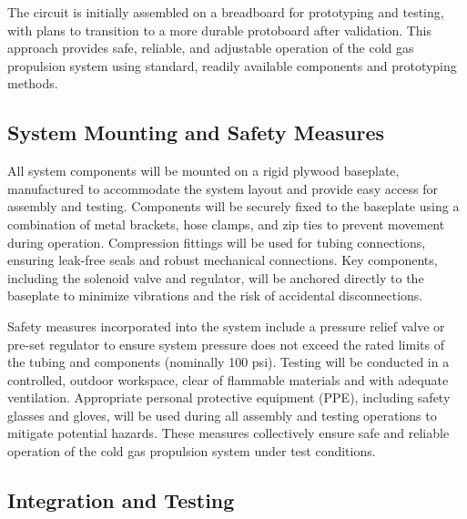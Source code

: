 \documentclass{new-aiaa}
\begin{document}
The circuit is initially assembled on a breadboard for prototyping and testing, with plans to transition to a more durable protoboard after validation. This approach provides safe, reliable, and adjustable operation of the cold gas propulsion system using standard, readily available components and prototyping methods.


\subsection{System Mounting and Safety Measures}

All system components will be mounted on a rigid plywood baseplate, manufactured to accommodate the system layout and provide easy access for assembly and testing. Components will be securely fixed to the baseplate using a combination of metal brackets, hose clamps, and zip ties to prevent movement during operation. Compression fittings will be used for tubing connections, ensuring leak-free seals and robust mechanical connections. Key components, including the solenoid valve and regulator, will be anchored directly to the baseplate to minimize vibrations and the risk of accidental disconnections.

Safety measures incorporated into the system include a pressure relief valve or pre-set regulator to ensure system pressure does not exceed the rated limits of the tubing and components (nominally 100 psi). Testing will be conducted in a controlled, outdoor workspace, clear of flammable materials and with adequate ventilation. Appropriate personal protective equipment (PPE), including safety glasses and gloves, will be used during all assembly and testing operations to mitigate potential hazards. These measures collectively ensure safe and reliable operation of the cold gas propulsion system under test conditions.


\subsection{Integration and Testing}
\end{document}
